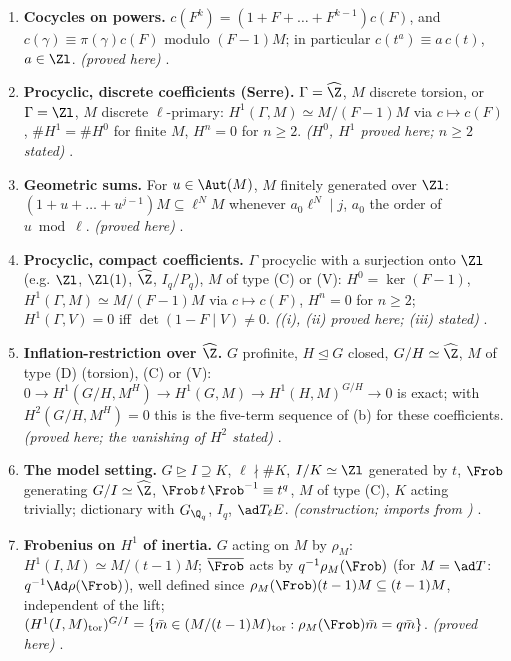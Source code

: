\begin{enumerate}[label=\textbf{\thechapter.\arabic*}]
\item \textbf{Cocycles on powers.} $c(F^k)=(1+F+\dots+F^{k-1})c(F)$, and $c(\gamma)\equiv\pi(\gamma)c(F)$ modulo $(F-1)M$; in particular $c(t^a)\equiv a\,c(t)$, $a\in\Zl$. \emph{(proved here)}
.
\item \textbf{Procyclic, discrete coefficients (Serre).} $\Gamma=\widehat\Z$, $M$ discrete torsion, or $\Gamma=\Zl$, $M$ discrete $\ell$-primary: $H^1(\Gamma,M)\simeq M/(F-1)M$ via $c\mapsto c(F)$,
$\#H^1=\#H^0$ for finite $M$, $H^n=0$ for $n\ge2$. \emph{($H^0$, $H^1$ proved here; $n\ge2$ stated)} .
\item \textbf{Geometric sums.} For $u\in\Aut(M)$, $M$ finitely generated over $\Zl$: $(1+u+\dots+u^{j-1})M\subseteq\ell^NM$ whenever $a_0\ell^N\mid j$, $a_0$ the order of $u\bmod\ell$. \emph{(proved here)}
.
\item \textbf{Procyclic, compact coefficients.} $\Gamma$ procyclic with a surjection onto $\Zl$ (e.g. $\Zl$, $\Zl(1)$, $\widehat\Z$, $I_q/P_q$), $M$ of type (C) or (V): $H^0=\ker(F-1)$,
$H^1(\Gamma,M)\simeq M/(F-1)M$ via $c\mapsto c(F)$, $H^n=0$ for $n\ge2$; $H^1(\Gamma,V)=0$ iff $\det(1-F\mid V)\ne0$. \emph{((i), (ii) proved here; (iii) stated)}
.
\item \textbf{Inflation-restriction over $\widehat\Z$.} $G$ profinite, $H\trianglelefteq G$ closed, $G/H\simeq\widehat\Z$, $M$ of type (D) (torsion), (C) or (V): $0\to H^1(G/H,M^H)\to H^1(G,M)\to
H^1(H,M)^{G/H}\to0$ is exact; with $H^2(G/H,M^H)=0$ this is the five-term sequence of (b) for these coefficients. \emph{(proved here; the vanishing of
$H^2$ stated)} .
\item \textbf{The model setting.} $G\trianglerighteq I\supseteq K$, $\ell\nmid\#K$, $I/K\simeq\Zl$ generated by $t$, $\Frob$ generating $G/I\simeq\widehat\Z$, $\Frob\,t\,\Frob^{-1}\equiv t^q$, $M$ of type (C),
$K$ acting trivially; dictionary with $G_{\Q_q}$, $I_q$, $\ad T_\ell E$. \emph{(construction; imports from )} .
\item \textbf{Frobenius on $H^1$ of inertia.} $G$ acting on $M$ by $\rho_M$: $H^1(I,M)\simeq M/(t-1)M$; $\overline\Frob$ acts by $q^{-1}\rho_M(\Frob)$ (for $M=\ad T$:
$q^{-1}\Ad\rho(\Frob)$), well defined since $\rho_M(\Frob)(t-1)M\subseteq(t-1)M$, independent of the lift;
$(H^1(I,M)_{\mathrm{tor}})^{G/I}=\{\bar m\in(M/(t-1)M)_{\mathrm{tor}}:\rho_M(\Frob)\bar m=q\bar m\}$. \emph{(proved here)} .

\end{enumerate}
